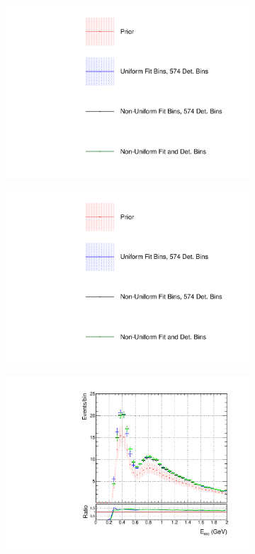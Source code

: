 \begin{figure}
\centering
\begin{subfigure}{0.3\textwidth}
  \centering
  \includegraphics[width=1.0\linewidth,  trim={5mm  80mm 0mm 0mm}, clip]{figs/polyasmvs_leg}
\end{subfigure}
\begin{subfigure}{0.3\textwidth}
  \centering
  \includegraphics[width=1.0\linewidth,  trim={5mm  0mm 0mm 95mm}, clip]{figs/polyasmvs_leg}
\end{subfigure}
\begin{subfigure}{.49\textwidth}
  \centering
  \includegraphics[width=0.95\linewidth]{figs/polySKnumu}

\end{subfigure}
\end{figure}
